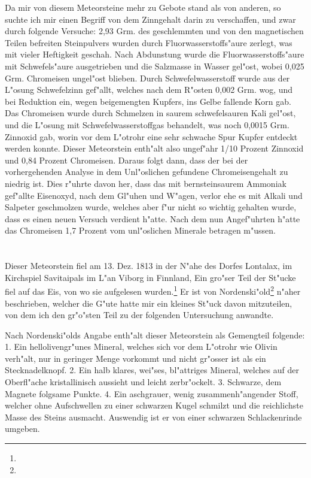 \documentclass[a4paper, 11pt, oneside]{article}
\begin{document}
Da mir von diesem Meteorsteine mehr zu Gebote stand als von anderen, so suchte ich mir einen Begriff von dem Zinngehalt darin zu verschaffen, und zwar durch folgende Versuche: 2,93 Grm. des geschlemmten und von den magnetischen Teilen befreiten Steinpulvers wurden durch Fluorwasserstoffs"aure zerlegt, was mit vieler Heftigkeit geschah. Nach Abdunstung wurde die Fluorwasserstoffs"aure mit Schwefels"aure ausgetrieben und die Salzmasse in Wasser gel"ost, wobei 0,025 Grm. Chromeisen ungel"ost blieben. Durch Schwefelwasserstoff wurde aus der L"osung Schwefelzinn gef"allt, welches nach dem R"osten 0,002 Grm. wog, und bei Reduktion ein, wegen beigemengten Kupfers, ins Gelbe fallende Korn gab. Das Chromeisen wurde durch Schmelzen in saurem schwefelsauren Kali gel"ost, und die L"osung mit Schwefelwasserstoffgas behandelt, was noch 0,0015 Grm. Zinnoxid gab, worin vor dem L"otrohr eine sehr schwache Spur Kupfer entdeckt werden konnte. Dieser Meteorstein enth"alt also ungef"ahr 1/10 Prozent Zinnoxid und 0,84 Prozent Chromeisen. Daraus folgt dann, dass der bei der vorhergehenden Analyse in dem Unl"oslichen gefundene Chromeisengehalt zu niedrig ist. Dies r"uhrte davon her, dass das mit bernsteinsaurem Ammoniak gef"allte Eisenoxyd, nach dem Gl"uhen und W"agen, verlor ehe es mit Alkali und Salpeter geschmolzen wurde, welches aber f"ur nicht so wichtig gehalten wurde, dass es einen neuen Versuch verdient h"atte. Nach dem nun Angef"uhrten h"atte das Chromeisen 1,7 Prozent vom unl"oslichen Minerale betragen m"ussen.

\section{}
\paragraph{}
Dieser Meteorstein fiel am 13. Dez. 1813 in der N"ahe des Dorfes Lontalax, im Kirchspiel Savitaipals im L"an Viborg in Finnland, Ein gro"ser Teil der St"ucke fiel auf das Eis, von wo sie aufgelesen wurden.\footnote{} Er ist von Nordenski"old\footnote{} n"aher beschrieben, welcher die G"ute hatte mir ein kleines St"uck davon mitzuteilen, von dem ich den gr"o"sten Teil zu der folgenden Untersuchung anwandte.

Nach Nordenski"olds Angabe enth"alt dieser Meteorstein als Gemengteil folgende: 1. Ein hellolivengr"unes Mineral, welches sich vor dem L"otrohr wie Olivin verh"alt, nur in geringer Menge vorkommt und nicht gr"osser ist als ein Stecknadelknopf. 2. Ein halb klares, wei"ses, bl"attriges Mineral, welches auf der Oberfl"ache kristallinisch aussieht und leicht zerbr"ockelt. 3. Schwarze, dem Magnete folgsame Punkte. 4. Ein aschgrauer, wenig zusammenh"angender Stoff, welcher ohne Aufschwellen zu einer schwarzen Kugel schmilzt und die reichlichste Masse des Steins ausmacht. Auswendig ist er von einer schwarzen Schlackenrinde umgeben.
\end{document}
